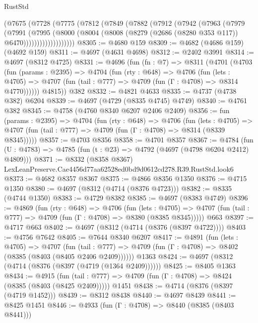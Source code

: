 \begin{lexlean}{RustStd}
\begin{coremodule}
          (@7675
            (@7728
              (@7775
                (@7812
                  (@7849
                    (@7882
                      (@7912
                        (@7942
                          (@7963
                            (@7979
                              (@7991
                                (@7995
                                  (@8000
                                    (@8004
                                      (@8008
                                        (@8279 (@2686 (@8280 @353 @117)) @6470)))))))))))))))))))
@8305 := @4680 @159
@8309 := @4682 (@4686 @159) (@4692 @159)
@8311 := @4697 (@4631 @4698)
@8312 := @2402 @3991
@8314 := @4697 (@8312 @4725)
@8331 := @4696
    (fun (fn : @7) =>
    @8311
      (@4701
        (@4703
          (fun (params : @2395) =>
          @4704
            (fun (rty : @648) =>
            @4706
              (fun (lets : @4705) =>
              @4707 (fun (tail : @777) => @4709 (fun (Γ : @4708) => @8314 @4770))))))
        @4815))
    @382
@8332 := @4821 @4633
@8335 := @4737 (@4738 @382) @6204
@8339 := @4697 (@4729 (@8335 @4745) @4749)
@8340 := @4761 @382
@8345 := @4758 (@4760 @8340 @6207 @2406 @2409)
@8356 := fun (params : @2395) =>
  @4704
    (fun (rty : @648) =>
    @4706
      (fun (lets : @4705) =>
      @4707 (fun (tail : @777) => @4709 (fun (Γ : @4708) => @8314 (@8339 @8345)))))
@8357 := @4703 @8356
@8358 := @4701 @8357
@8367 := @4784 (fun (U : @4783) => @4785 (fun (t : @23) => @4792 (@4697 (@4798 @6204 @2412) @4809)))
@8371 := @8332 (@8358 @8367) LexLeanPreserve.Cae4456d77aa62528ed0bd9d0612cd278.R39.RustStd.look6
@8373 := @4682 @8357 @8367
@8375 := @4866 @8356 @1350
@8376 := @4715 @1350
@8380 := @4697 (@8312 (@4714 (@8376 @4723)))
@8382 := @8335 (@4744 @1350)
@8383 := @4729 @8382
@8385 := @4697 (@8383 @4749)
@8396 := @4869
    (fun (rty : @648) =>
    @4706
      (fun (lets : @4705) =>
      @4707 (fun (tail : @777) => @4709 (fun (Γ : @4708) => @8380 (@8385 @8345)))))
    @663
@8397 := @4717 @663
@8402 := @4697 (@8312 (@4714 (@8376 (@8397 @4722))))
@8403 := @4756 @7642
@8405 := @7644 @8340 @6207
@8417 := @4891
    (fun (lets : @4705) =>
    @4707
      (fun (tail : @777) => @4709 (fun (Γ : @4708) => @8402 (@8385 (@8403 (@8405 @2406 @2409))))))
    @1363
@8424 := @4697 (@8312 (@4714 (@8376 (@8397 (@4719 (@1364 @2409))))))
@8425 := @8405 @1363
@8434 := @4915
    (fun (tail : @777) => @4709 (fun (Γ : @4708) => @8424 (@8385 (@8403 (@8425 @2409)))))
    @1451
@8438 := @4714 (@8376 (@8397 (@4719 @1452)))
@8439 := @8312 @8438
@8440 := @4697 @8439
@8441 := @8425 @1451
@8446 := @4933 (fun (Γ : @4708) => @8440 (@8385 (@8403 @8441)))

\end{coremodule}
\end{lexlean}
